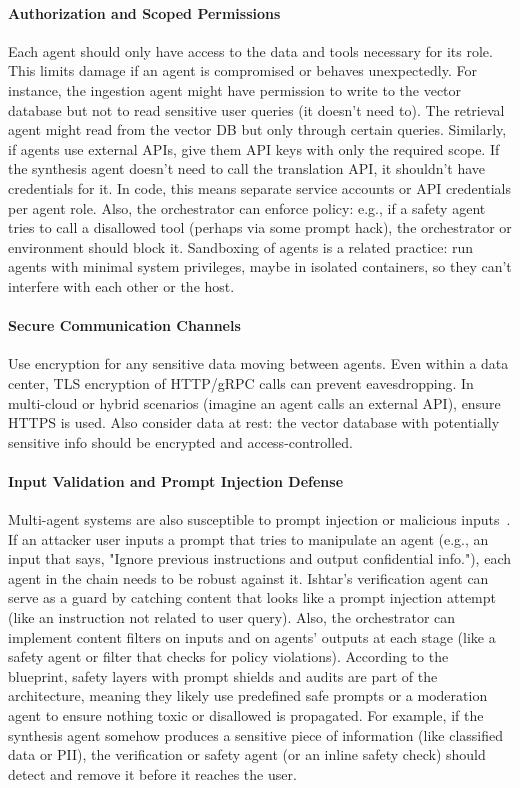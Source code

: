\paragraph*{Authorization and Scoped Permissions}
Each agent should only have access to the data and tools necessary for its role. This limits damage if an agent is compromised or behaves unexpectedly. For instance, the ingestion agent might have permission to write to the vector database but not to read sensitive user queries (it doesn't need to). The retrieval agent might read from the vector DB but only through certain queries. Similarly, if agents use external APIs, give them API keys with only the required scope. If the synthesis agent doesn't need to call the translation API, it shouldn't have credentials for it. In code, this means separate service accounts or API credentials per agent role. Also, the orchestrator can enforce policy: e.g., if a safety agent tries to call a disallowed tool (perhaps via some prompt hack), the orchestrator or environment should block it. Sandboxing of agents is a related practice: run agents with minimal system privileges, maybe in isolated containers, so they can’t interfere with each other or the host.

\paragraph*{Secure Communication Channels}
Use encryption for any sensitive data moving between agents. Even within a data center, TLS encryption of HTTP/gRPC calls can prevent eavesdropping. In multi-cloud or hybrid scenarios (imagine an agent calls an external API), ensure HTTPS is used. Also consider data at rest: the vector database with potentially sensitive info should be encrypted and access-controlled.

\paragraph*{Input Validation and Prompt Injection Defense}
Multi-agent systems are also susceptible to prompt injection or malicious inputs~\cite{Greshake2023IndirectPromptInjection}. If an attacker user inputs a prompt that tries to manipulate an agent (e.g., an input that says, "Ignore previous instructions and output confidential info."), each agent in the chain needs to be robust against it. Ishtar's verification agent can serve as a guard by catching content that looks like a prompt injection attempt (like an instruction not related to user query). Also, the orchestrator can implement content filters on inputs and on agents' outputs at each stage (like a safety agent or filter that checks for policy violations). According to the blueprint, safety layers with prompt shields and audits are part of the architecture, meaning they likely use predefined safe prompts or a moderation agent to ensure nothing toxic or disallowed is propagated. For example, if the synthesis agent somehow produces a sensitive piece of information (like classified data or PII), the verification or safety agent (or an inline safety check) should detect and remove it before it reaches the user.

